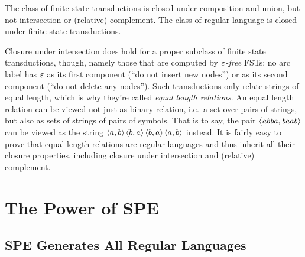 \begin{theorem}
    The class of finite state transductions is closed under composition and union, but not intersection or (relative) complement.
    The class of regular language is closed under finite state transductions.
\end{theorem}

Closure under intersection does hold for a proper subclass of finite state transductions, though, namely those that are computed by \emph{$\varepsilon$-free} FSTs: no arc label has $\varepsilon$ as its first component (``do not insert new nodes'') or as its second component (``do not delete any nodes'').
Such transductions only relate strings of equal length, which is why they're called \emph{equal length relations}.
An equal length relation can be viewed not just as binary relation, i.e.\ a set over pairs of strings, but also as sets of strings of pairs of symbols.
That is to say, the pair $\left \langle \mathit{abba},\mathit{baab} \right \rangle $ can be viewed as the string $\left \langle a,b \right \rangle \left \langle b,a \right \rangle \left \langle b,a \right \rangle \left \langle a,b \right \rangle $ instead.
It is fairly easy to prove that equal length relations are regular languages and thus inherit all their closure properties, including closure under intersection and (relative) complement.


\section{The Power of SPE}

\subsection{SPE Generates All Regular Languages}

